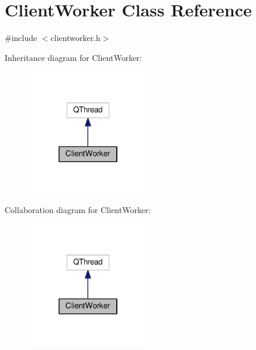 \hypertarget{class_client_worker}{}\section{Client\+Worker Class Reference}
\label{class_client_worker}


{\ttfamily \#include $<$clientworker.\+h$>$}



Inheritance diagram for Client\+Worker\+:
\nopagebreak
\begin{figure}[H]
\begin{center}
\leavevmode
\includegraphics[width=154pt]{class_client_worker__inherit__graph}
\end{center}
\end{figure}


Collaboration diagram for Client\+Worker\+:
\nopagebreak
\begin{figure}[H]
\begin{center}
\leavevmode
\includegraphics[width=154pt]{class_client_worker__coll__graph}
\end{center}
\end{figure}
